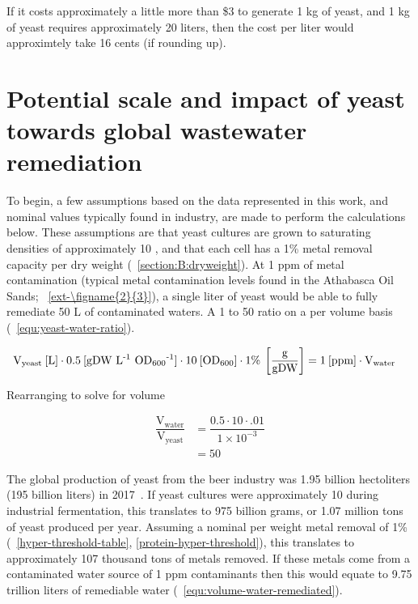 \documentclass[../main/main]{subfiles}
\begin{document}
\noindent If it costs approximately a little more than \$3 to generate 1 kg of yeast, and 1 kg of yeast requires approximately 20 liters, then the cost per liter would approximtely take 16 cents (if rounding up).

\section{Potential scale and impact of yeast towards global wastewater remediation}
\label{section:appendixB:impact-of-yeast}
To begin, a few assumptions based on the data represented in this work, and nominal values typically found in industry, are made to perform the calculations below. These assumptions are that yeast cultures are grown to saturating densities of approximately 10 \OD{}, and that each cell has a 1\% metal removal capacity per dry weight (\SECTION~\ref{section:B:dryweight}). At 1 ppm of metal contamination (typical metal contamination levels found in the Athabasca Oil Sands; \FIGURE~\ref{ext-\figname{2}{3}}), a single liter of yeast would be able to fully remediate 50 L of contaminated waters. A 1 to 50 ratio on a per volume basis (\EQUATION~\ref{equ:yeast-water-ratio}).

\begin{align}
  \text{V}_{\text{yeast}}\: [\text{L}]
  \cdot 0.5\:[\text{gDW L\textsuperscript{-1} OD\textsubscript{600}\textsuperscript{-1}}]
  \cdot 10\: [\text{OD\textsubscript{600}}]
  \cdot 1\%\: \left[\dfrac{\text{g}}{\text{gDW}}\right]
  & =
  1\:[\text{ppm}] \cdot \text{V}_{\text{water}}
\end{align}

Rearranging to solve for volume

\begin{align}
  \dfrac{\text{V}_{\text{water}}}{\text{V}_{\text{yeast}}}
    &= \dfrac{0.5 \cdot 10 \cdot .01}{1 \times 10^{-3}}
    \label{equ:yeast-water-ratio}
  \\[1em]
    &= 50 \nonumber
\end{align}

The global production of yeast from the beer industry was 1.95 billion hectoliters (195 billion liters) in 2017~\cite{barth-haasgroup.2019}. If yeast cultures were approximately 10 \OD{} during industrial fermentation, this translates to 975 billion grams, or 1.07 million tons of yeast produced per year. Assuming a nominal per weight metal removal of 1\% (\TABLE~\ref{hyper-threshold-table}, \ref{protein-hyper-threshold}), this translates to approximately 107 thousand tons of metals removed. If these metals come from a contaminated water source of 1 ppm contaminants
then this would equate to 9.75 trillion liters of remediable water (\EQUATION~\ref{equ:volume-water-remediated}).
\end{document}
